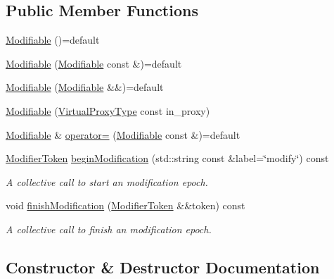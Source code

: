 \subsection*{Public Member Functions}
\begin{DoxyCompactItemize}
\item 
\hyperlink{structvt_1_1vrt_1_1collection_1_1_modifiable_a8b0258fb2d56fa28959cbb89a3bf7d5f}{Modifiable} ()=default
\item 
\hyperlink{structvt_1_1vrt_1_1collection_1_1_modifiable_a783537b097c2f010ee4d9bfa74153f60}{Modifiable} (\hyperlink{structvt_1_1vrt_1_1collection_1_1_modifiable}{Modifiable} const \&)=default
\item 
\hyperlink{structvt_1_1vrt_1_1collection_1_1_modifiable_a56475c70666566d7455bdc20d239cf6f}{Modifiable} (\hyperlink{structvt_1_1vrt_1_1collection_1_1_modifiable}{Modifiable} \&\&)=default
\item 
\hyperlink{structvt_1_1vrt_1_1collection_1_1_modifiable_a33012fc2dfcbebfc87ada0dd22b15085}{Modifiable} (\hyperlink{namespacevt_a1b417dd5d684f045bb58a0ede70045ac}{Virtual\+Proxy\+Type} const in\+\_\+proxy)
\item 
\hyperlink{structvt_1_1vrt_1_1collection_1_1_modifiable}{Modifiable} \& \hyperlink{structvt_1_1vrt_1_1collection_1_1_modifiable_a4eaeef4b3bc127d86fa9014361fb587d}{operator=} (\hyperlink{structvt_1_1vrt_1_1collection_1_1_modifiable}{Modifiable} const \&)=default
\item 
\hyperlink{structvt_1_1vrt_1_1collection_1_1_modifier_token}{Modifier\+Token} \hyperlink{structvt_1_1vrt_1_1collection_1_1_modifiable_af53b2012d58ed0f16ab9aa4a43f7716b}{begin\+Modification} (std\+::string const \&label=\char`\"{}modify\char`\"{}) const
\begin{DoxyCompactList}\small\item\em A collective call to start an modification epoch. \end{DoxyCompactList}\item 
void \hyperlink{structvt_1_1vrt_1_1collection_1_1_modifiable_abfc07017dfd8a96acb2eb9c456f659f1}{finish\+Modification} (\hyperlink{structvt_1_1vrt_1_1collection_1_1_modifier_token}{Modifier\+Token} \&\&token) const
\begin{DoxyCompactList}\small\item\em A collective call to finish an modification epoch. \end{DoxyCompactList}\end{DoxyCompactItemize}


\subsection{Constructor \& Destructor Documentation}
\mbox{\label{structvt_1_1vrt_1_1collection_1_1_modifiable_a8b0258fb2d56fa28959cbb89a3bf7d5f}} 
